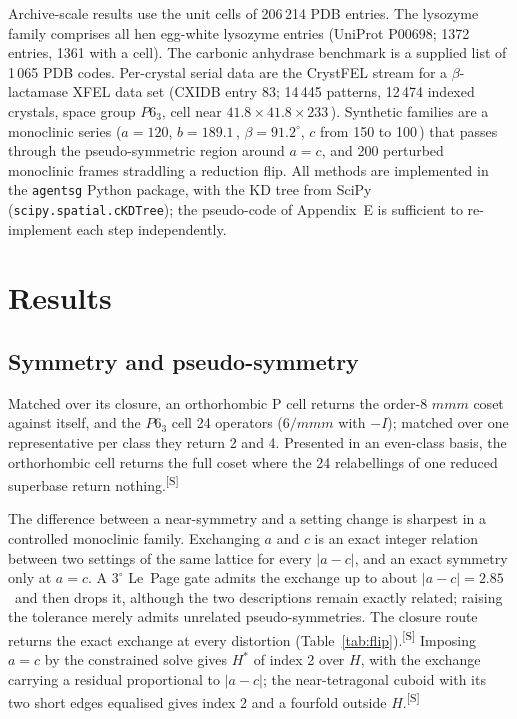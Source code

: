 \documentclass[preprint,pdf]{iucr}          %
\makeatletter
\newcommand{\Ang}{\text{\AA}}
\newcommand{\chk}[1]{\textsuperscript{[S\@nameuse{zn@#1}]}}
\makeatother
\begin{document}
Archive-scale results use the unit cells of 206\,214 PDB entries. The lysozyme family comprises all hen egg-white lysozyme entries (UniProt P00698; 1372 entries, 1361 with a cell). The carbonic anhydrase benchmark is a supplied list of 1\,065 PDB codes. Per-crystal serial data are the CrystFEL stream for a $\beta$-lactamase XFEL data set (CXIDB entry 83; 14\,445 patterns, 12\,474 indexed crystals, space group $P6_3$, cell near $41.8\times41.8\times233$\,\Ang). Synthetic families are a monoclinic series ($a=120$, $b=189.1$\,\Ang, $\beta=91.2^\circ$, $c$ from 150 to 100\,\Ang) that passes through the pseudo-symmetric region around $a=c$, and 200 perturbed monoclinic frames straddling a reduction flip. All methods are implemented in the \texttt{agentsg} Python package, with the KD tree from SciPy (\texttt{scipy.spatial.cKDTree}); the pseudo-code of Appendix~E is sufficient to re-implement each step independently.

\section{Results}
\label{sec:results}

\subsection{Symmetry and pseudo-symmetry}
\label{sec:res-sym}
\label{sec:flip}

Matched over its closure, an orthorhombic P cell returns the order-8 $mmm$ coset against itself, and the $P6_3$ cell 24 operators ($6/mmm$ with $-I$); matched over one representative per class they return 2 and 4. Presented in an even-class basis, the orthorhombic cell returns the full coset where the 24 relabellings of one reduced superbase return nothing.\chk{z:coset}

The difference between a near-symmetry and a setting change is sharpest in a controlled monoclinic family. Exchanging $a$ and $c$ is an exact integer relation between two settings of the same lattice for every $|a-c|$, and an exact symmetry only at $a=c$. A $3^\circ$ Le~Page gate admits the exchange up to about $|a-c|=2.85$\,\Ang\ and then drops it, although the two descriptions remain exactly related; raising the tolerance merely admits unrelated pseudo-symmetries. The closure route returns the exact exchange at every distortion (Table~\ref{tab:flip}).\chk{z:lepage} Imposing $a=c$ by the constrained solve gives $H^*$ of index 2 over $H$, with the exchange carrying a residual proportional to $|a-c|$; the near-tetragonal cuboid with its two short edges equalised gives index 2 and a fourfold outside $H$.\chk{z:pseudo}
\end{document}
